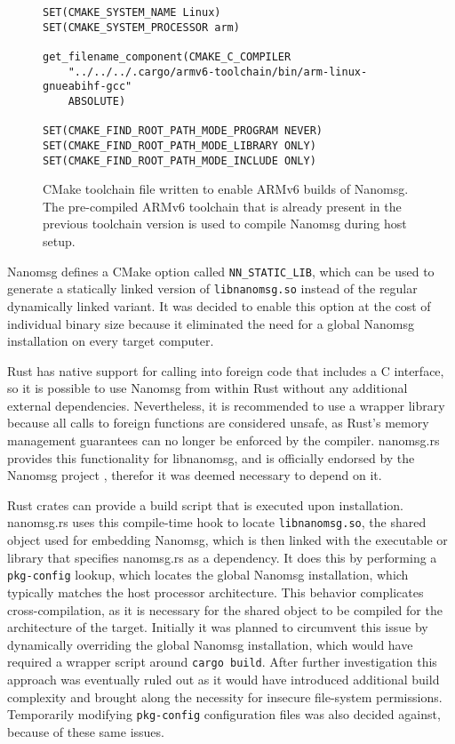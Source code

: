 \begin{figure}[H]
\begin{verbatim}
SET(CMAKE_SYSTEM_NAME Linux)
SET(CMAKE_SYSTEM_PROCESSOR arm)

get_filename_component(CMAKE_C_COMPILER 
	"../../../.cargo/armv6-toolchain/bin/arm-linux-gnueabihf-gcc" 
	ABSOLUTE)

SET(CMAKE_FIND_ROOT_PATH_MODE_PROGRAM NEVER)
SET(CMAKE_FIND_ROOT_PATH_MODE_LIBRARY ONLY)
SET(CMAKE_FIND_ROOT_PATH_MODE_INCLUDE ONLY)
\end{verbatim}
\caption{CMake toolchain file written to enable ARMv6 builds of Nanomsg. The pre-compiled ARMv6 toolchain that is already present in the previous toolchain version is used to compile Nanomsg during host setup.} 
\end{figure}

Nanomsg defines a CMake option called \texttt{NN\_STATIC\_LIB}, which can be used to generate a statically linked version of \texttt{libnanomsg.so} instead of the regular dynamically linked variant. It was decided to enable this option at the cost of individual binary size because it eliminated the need for a global Nanomsg installation on every target computer.

Rust has native support for calling into foreign code that includes a C interface, so it is possible to use Nanomsg from within Rust without any additional external dependencies. Nevertheless, it is recommended to use a wrapper library because all calls to foreign functions are considered unsafe, as Rust's memory management guarantees can no longer be enforced by the compiler. nanomsg.rs provides this functionality for libnanomsg, and is officially endorsed by the Nanomsg project \cite{nanomsg-bindings}, therefor it was deemed necessary to depend on it.

Rust crates can provide a build script that is executed upon installation. nanomsg.rs uses this compile-time hook to locate \texttt{libnanomsg.so}, the shared object used for embedding Nanomsg, which is then linked with the executable or library that specifies nanomsg.rs as a dependency. It does this by performing a \texttt{pkg-config} lookup, which locates the global Nanomsg installation, which typically matches the host processor architecture. This behavior complicates cross-compilation, as it is necessary for the shared object to be compiled for the architecture of the target. 
Initially it was planned to circumvent this issue by dynamically overriding the global Nanomsg installation, which would have required a wrapper script around \texttt{cargo build}. After further investigation this approach was eventually ruled out as it would have introduced additional build complexity and brought along the necessity for insecure file-system permissions. Temporarily modifying \texttt{pkg-config} configuration files was also decided against, because of these same issues. 


